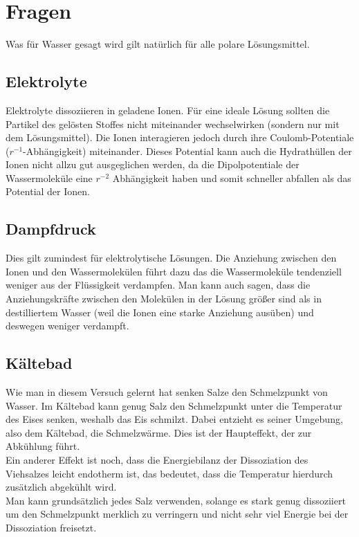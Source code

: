 \section{Fragen}
Was für Wasser gesagt wird gilt natürlich für alle polare Lösungsmittel.

\subsection{Elektrolyte}
Elektrolyte dissoziieren in geladene Ionen. Für eine ideale Lösung sollten die Partikel des gelösten Stoffes nicht miteinander wechselwirken (sondern nur mit dem Lösungsmittel). Die Ionen interagieren jedoch durch ihre Coulomb-Potentiale ($r^{-1}$-Abhängigkeit) miteinander. Dieses Potential kann auch die Hydrathüllen der Ionen nicht allzu gut ausgeglichen werden, da die Dipolpotentiale der Wassermoleküle eine $r^{-2}$ Abhängigkeit haben und somit schneller abfallen als das Potential der Ionen.

\subsection{Dampfdruck}
Dies gilt zumindest für elektrolytische Lösungen. Die Anziehung zwischen den Ionen und den Wassermolekülen führt dazu das die Wassermoleküle tendenziell weniger aus der Flüssigkeit verdampfen. Man kann auch sagen, dass die Anziehungskräfte zwischen den Molekülen in der Lösung größer sind als in destilliertem Wasser (weil die Ionen eine starke Anziehung ausüben) und deswegen weniger verdampft.

\subsection{Kältebad}
Wie man in diesem Versuch gelernt hat senken Salze den Schmelzpunkt von Wasser. Im Kältebad kann genug Salz den Schmelzpunkt unter die Temperatur des Eises senken, weshalb das Eis schmilzt. Dabei entzieht es seiner Umgebung, also dem Kältebad, die Schmelzwärme. Dies ist der Haupteffekt, der zur Abkühlung führt.\\
Ein anderer Effekt ist noch, dass die Energiebilanz der Dissoziation des Viehsalzes leicht endotherm ist, das bedeutet, dass die Temperatur hierdurch zusätzlich abgekühlt wird.\\
Man kann grundsätzlich jedes Salz verwenden, solange es stark genug dissoziiert um den Schmelzpunkt merklich zu verringern und nicht sehr viel Energie bei der Dissoziation freisetzt.

